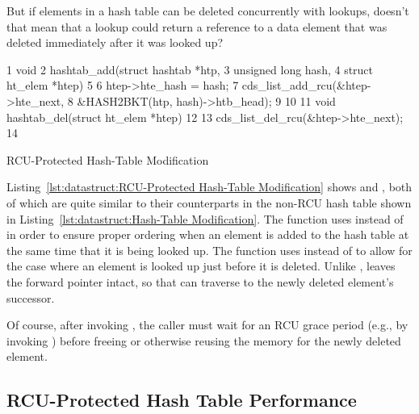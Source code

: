 \QuickQuiz{}
	But if elements in a hash table can be deleted concurrently
	with lookups, doesn't that mean that a lookup could return
	a reference to a data element that was deleted immediately
	after it was looked up?
 \QuickQuizEnd

\begin{listing}[tb]
{ \scriptsize
\begin{verbbox}
 1 void
 2 hashtab_add(struct hashtab *htp,
 3             unsigned long hash,
 4             struct ht_elem *htep)
 5 {
 6   htep->hte_hash = hash;
 7   cds_list_add_rcu(&htep->hte_next,
 8                    &HASH2BKT(htp, hash)->htb_head);
 9 }
10 
11 void hashtab_del(struct ht_elem *htep)
12 {
13   cds_list_del_rcu(&htep->hte_next);
14 }
\end{verbbox}
}
\centering
\theverbbox
\caption{RCU-Protected Hash-Table Modification}
\label{lst:datastruct:RCU-Protected Hash-Table Modification}
\end{listing}

Listing~\ref{lst:datastruct:RCU-Protected Hash-Table Modification}
shows  and , both of which
are quite similar to their counterparts in the non-RCU hash table
shown in
Listing~\ref{lst:datastruct:Hash-Table Modification}.
The  function uses  instead
of  in order to ensure proper ordering when
an element is added to the hash table at the same time that it is
being looked up.
The  function uses  instead
of  to allow for the case where an element is
looked up just before it is deleted.
Unlike ,  leaves the
forward pointer intact, so that  can traverse
to the newly deleted element's successor.

Of course, after invoking , the caller must wait for
an RCU grace period (e.g., by invoking ) before
freeing or otherwise reusing the memory for the newly deleted element.

\subsection{RCU-Protected Hash Table Performance}
\label{sec:datastruct:RCU-Protected Hash Table Performance}

